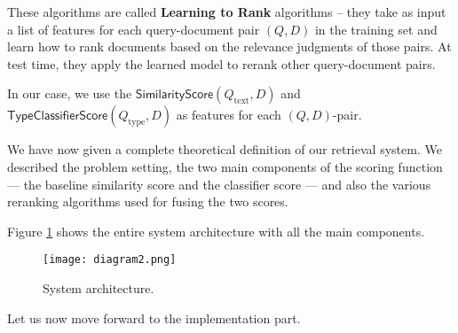 These algorithms are called \textbf{Learning to Rank} algorithms --
they take as input a list of features for each query-document pair $(Q,D)$ in the training set
and learn how to rank documents based on the
relevance judgments of those pairs. At test time, they apply the learned model to rerank other query-document pairs.

In our case, we use the $\textsf{SimilarityScore}(Q_{\text{text}},D)$ and $\textsf{TypeClassifierScore}(Q_{\text{type}}, D)$ 
as features for each $(Q,D)$-pair.

We have now given a complete theoretical definition of our retrieval system. We described the problem setting,
the two main components of the scoring function --- the baseline similarity score and the classifier score ---
and also the various reranking algorithms used for fusing the two scores.

Figure \ref{diagram2} shows the entire system architecture with all the main components.

\begin{figure}
\centerline{
  \texttt{[image: diagram2.png]}
  }
  \caption{System architecture.}
  \label{diagram2}
\end{figure}

Let us now move forward to the implementation part.


